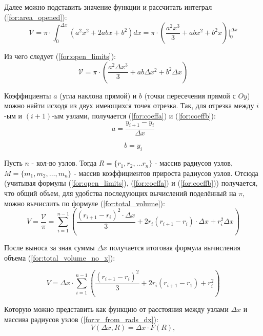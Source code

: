 Далее можно подставить значение функции и рассчитать интеграл (\ref{for:area_opened}):
\begin{equation}
    \label{for:area_opened}
    \mathcal{V} = \pi \cdot \int_{0}^{\Delta x}\left(a^2x^2 + 2abx + b^2\right)dx = \pi \cdot \left(\frac{a^2x^3}{3} + abx^2 + b^2x\right)\Biggr|_{0}^{\Delta x}
\end{equation}

Из чего следует (\ref{for:open_limits}):
\begin{equation}
    \label{for:open_limits}
    \mathcal{V} = \pi \cdot \left(\frac{a^2\Delta x^3}{3} + ab\Delta x^2 + b^2\Delta x\right)
\end{equation}

Коэффициенты $a$ (угла наклона прямой) и $b$ (точки пересечения прямой с $Oy$) можно найти исходя из двух имеющихся точек отрезка. Так, для отрезка между $i$-ым и $(i+1)$-ым узлами, получается (\ref{for:coeffa}) и (\ref{for:coeffb}):
\begin{equation}
    \label{for:coeffa}
    a = \frac{y_{i+1} - y_{i}}{\Delta x}
\end{equation}

\begin{equation}
    \label{for:coeffb}
    b = y_i
\end{equation}

Пусть $n$ - кол-во узлов. Тогда $R = \{ r_1, r_2, \ldots r_n \}$ - массив радиусов узлов, $M = \{ m_1, m_2, \ldots, m_n \}$ - массив коэффициентов прироста радиусов узлов. Отсюда (учитывая формулы (\ref{for:open_limits}), (\ref{for:coeffa}) и (\ref{for:coeffb})) получается, что общий объем, для удобства последующих вычислений поделённый на $\pi$, можно вычислить по формуле (\ref{for:total_volume}):
\begin{equation}
    \label{for:total_volume}
    V = \frac{\mathcal{V}}{\pi} = \sum_{i=1}^{n-1} \left(\frac{(r_{i + 1} - r_i)^2 \cdot \Delta x}{3} + 2 r_i (r_{i + 1} - r_i) \cdot \Delta x + r_i^2 \Delta x \right)
\end{equation}

После выноса за знак суммы $\Delta x$ получается итоговая формула вычисления объема (\ref{for:total_volume_no_x}):

\begin{equation}
    \label{for:total_volume_no_x}
    V = \Delta x \cdot \sum_{i=1}^{n-1} \left(\frac{(r_{i + 1} - r_i)^2}{3} + 2 r_i (r_{i + 1} - r_1) + r_i^2 \right)
\end{equation}

Которую можно представить как функцию от расстояния между узлами $\Delta x$ и массива радиусов узлов (\ref{for:v_from_rads_dx}):
\begin{equation}
    \label{for:v_from_rads_dx}
    V(\Delta x, R) = \Delta x \cdot F(R), 
\end{equation}

